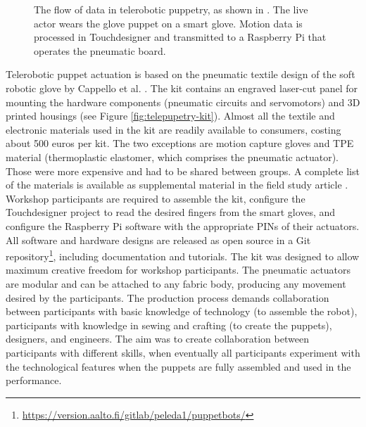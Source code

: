 \documentclass[dissertation,math,vertlayout,pdfa,colorlinks]{aaltoseries}
\begin{document}
\begin{figure}
    \centering
    
    \caption{The flow of data in telerobotic puppetry, as shown in \cite{peledTeleroboticTheaterOppressed2025}. The live actor wears the glove puppet on a smart glove. Motion data is processed in Touchdesigner and transmitted to a Raspberry Pi that operates the pneumatic board.}
    \label{fig:telepuppetry-diagram}
\end{figure}

Telerobotic puppet actuation is based on the pneumatic textile design of the soft robotic glove by Cappello et al. \cite{cappelloExploitingTextileMechanical2018,cappelloAssistingHandFunction2018}. The kit contains an engraved laser-cut panel for mounting the hardware components (pneumatic circuits and servomotors) and 3D printed housings (see Figure \ref{fig:telepupetry-kit}). Almost all the textile and electronic materials used in the kit are readily available to consumers, costing about 500 euros per kit. The two exceptions are motion capture gloves and TPE material (thermoplastic elastomer, which comprises the pneumatic actuator). Those were more expensive and had to be shared between groups. A complete list of the materials is available as supplemental material in the field study article \cite{peledTeleroboticTheaterOppressed2025}. Workshop participants are required to assemble the kit, configure the Touchdesigner project to read the desired fingers from the smart gloves, and configure the Raspberry Pi software with the appropriate PINs of their actuators. All software and hardware designs are released as open source in a Git repository\footnote{\url{https://version.aalto.fi/gitlab/peleda1/puppetbots/}}, including documentation and tutorials. The kit was designed to allow maximum creative freedom for workshop participants. The pneumatic actuators are modular and can be attached to any fabric body, producing any movement desired by the participants. The production process demands collaboration between participants with basic knowledge of technology (to assemble the robot), participants with knowledge in sewing and crafting (to create the puppets), designers, and engineers. The aim was to create collaboration between participants with different skills, when eventually all participants experiment with the technological features when the puppets are fully assembled and used in the performance.
\end{document}
